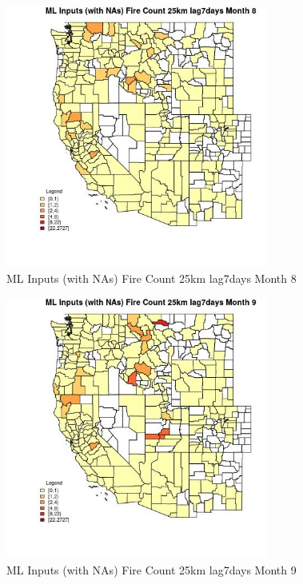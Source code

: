 \begin{figure} 
\centering  
\includegraphics[width=0.77\textwidth]{Code_Outputs/Report_ML_input_PM25_Step4_part_f_de_duplicated_aveswNAs_CountyFire_Count_25km_lag7daysmedianMonth8.jpg} 
\caption{\label{fig:Report_ML_input_PM25_Step4_part_f_de_duplicated_aveswNAsCountyFire_Count_25km_lag7daysmedianMonth8}ML Inputs (with NAs) Fire Count 25km lag7days Month 8} 
\end{figure} 
 

\begin{figure} 
\centering  
\includegraphics[width=0.77\textwidth]{Code_Outputs/Report_ML_input_PM25_Step4_part_f_de_duplicated_aveswNAs_CountyFire_Count_25km_lag7daysmedianMonth9.jpg} 
\caption{\label{fig:Report_ML_input_PM25_Step4_part_f_de_duplicated_aveswNAsCountyFire_Count_25km_lag7daysmedianMonth9}ML Inputs (with NAs) Fire Count 25km lag7days Month 9} 
\end{figure} 
 

